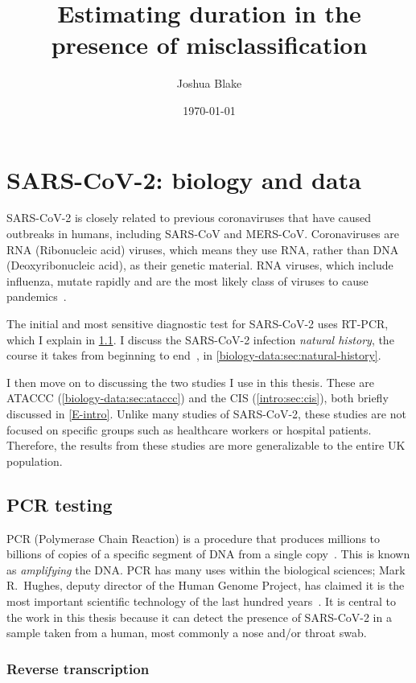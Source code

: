 \documentclass[thesis.tex]{subfiles}
\title{Estimating duration in the presence of misclassification}
\author{Joshua Blake}
\date{\today}
\begin{document}
\ifSubfilesClassLoaded{
  \setcounter{chapter}{1}
}

\chapter{SARS-CoV-2: biology and data} \label{biology-data}

SARS-CoV-2 is closely related to previous coronaviruses that have caused outbreaks in humans, including SARS-CoV and MERS-CoV.
Coronaviruses are RNA (Ribonucleic acid) viruses, which means they use RNA, rather than DNA (Deoxyribonucleic acid), as their genetic material.
RNA viruses, which include influenza, mutate rapidly and are the most likely class of viruses to cause pandemics~\autocite{woolhouseRNA}.

The initial and most sensitive diagnostic test for SARS-CoV-2 uses RT-PCR, which I explain in \cref{biology-data:sec:PCR}.
I discuss the SARS-CoV-2 infection \emph{natural history}, the course it takes from beginning to end~\autocite[193]{portaEpiDictionary}, in \cref{biology-data:sec:natural-history}.

I then move on to discussing the two studies I use in this thesis.
These are ATACCC (\cref{biology-data:sec:ataccc}) and the CIS (\cref{intro:sec:cis}), both briefly discussed in \cref{E-intro}.
Unlike many studies of SARS-CoV-2, these studies are not focused on specific groups such as healthcare workers or hospital patients.
Therefore, the results from these studies are more generalizable to the entire UK population.

\section{PCR testing} \label{biology-data:sec:PCR}

PCR (Polymerase Chain Reaction) is a procedure that produces millions to billions of copies of a specific segment of DNA  from a single copy~\autocite{smithPCR,garibyanPCR}.
This is known as \emph{amplifying} the DNA.
PCR has many uses within the biological sciences; Mark R.\ Hughes, deputy director of the Human Genome Project, has claimed it is the most important scientific technology of the last hundred years~\autocite{powledgePCR}.
It is central to the work in this thesis because it can detect the presence of SARS-CoV-2 in a sample taken from a human, most commonly a nose and/or throat swab.

\subsection{Reverse transcription}
\end{document}

